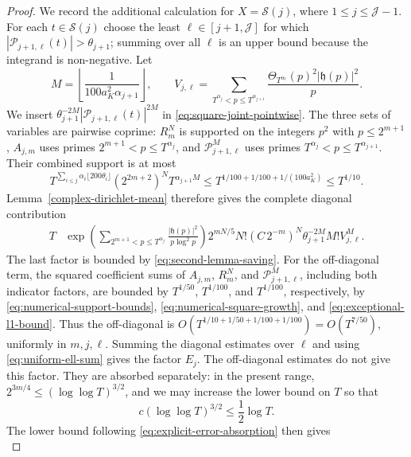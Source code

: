 \documentclass[twoside,reqno,11pt,a4paper]{amsart}
\numberwithin{equation}{section}
\theoremstyle{plain}
\theoremstyle{definition}
\theoremstyle{remark}
\renewcommand{\le}{\leqslant}
\begin{document}
\begin{proof}
We record the additional calculation for $X=\mathcal S(j)$, where
$1\le j\le\mathcal J-1$.  For each
$t\in\mathcal S(j)$ choose the least $\ell\in[j+1,\mathcal J]$ for which
$|\mathcal P_{j+1,\ell}(t)|>\theta_{j+1}$; summing over all $\ell$ is an
upper bound because the integrand is non-negative.  Let
\begin{equation*}
 M=\left\lfloor\frac1{100a_K^2\alpha_{j+1}}\right\rfloor,
 \qquad
 V_{j,\ell}=\sum_{T^{\alpha_j}<p\le T^{\alpha_{j+1}}}
 \frac{\Theta_{T^{\alpha_\ell}}(p)^2|\mathfrak h(p)|^2}{p}.
\end{equation*}
We insert
$\theta_{j+1}^{-2M}|\mathcal P_{j+1,\ell}(t)|^{2M}$ in
\eqref{eq:square-joint-pointwise}.  The three sets of variables are pairwise
coprime: $R_m^N$ is supported on the integers $p^2$ with $p\le2^{m+1}$,
$A_{j,m}$ uses primes $2^{m+1}<p\le T^{\alpha_j}$, and
$\mathcal P_{j+1,\ell}^M$ uses primes
$T^{\alpha_j}<p\le T^{\alpha_{j+1}}$.  Their combined support is at most
\begin{equation*}
 T^{\sum_{i\le j}\alpha_i\lfloor200\theta_i\rfloor}
 (2^{2m+2})^N T^{\alpha_{j+1}M}
 \le T^{1/100+1/100+1/(100a_K^2)}\le T^{1/10}.
\end{equation*}
Lemma~\ref{complex-dirichlet-mean} therefore gives the complete diagonal
contribution
\begin{align*}
 T&\exp\left(\sum_{2^{m+1}<p\le T^{\alpha_j}}
 \frac{|\mathfrak h(p)|^2}{p\log^2p}\right)
 2^{mN/5}N!\left(C\,2^{-m}\right)^N
 \theta_{j+1}^{-2M}M!V_{j,\ell}^M.
\end{align*}
The last factor is bounded by \eqref{eq:second-lemma-saving}.  For the
off-diagonal term, the squared coefficient sums of $A_{j,m}$, $R_m^N$, and
$\mathcal P_{j+1,\ell}^M$, including both indicator factors, are bounded by
$T^{1/50}$, $T^{1/100}$, and $T^{1/100}$, respectively, by
\eqref{eq:numerical-support-bounds}, \eqref{eq:numerical-square-growth}, and
\eqref{eq:exceptional-l1-bound}.  Thus the off-diagonal is
$O(T^{1/10+1/50+1/100+1/100})=O(T^{7/50})$, uniformly in $m,j,\ell$.
Summing the diagonal estimates over $\ell$ and using
\eqref{eq:uniform-ell-sum} gives the factor $E_j$.  The off-diagonal
estimates do not give this factor.  They are absorbed separately: in the
present range, $2^{3m/4}\le(\log\log T)^{3/2}$, and we may increase the
lower bound on $T$ so that
\begin{equation*}
c(\log\log T)^{3/2}\le\frac12\log T.
\end{equation*}
The lower bound following \eqref{eq:explicit-error-absorption} then gives
\begin{equation*}

\end{equation*}
\end{proof}
\end{document}

